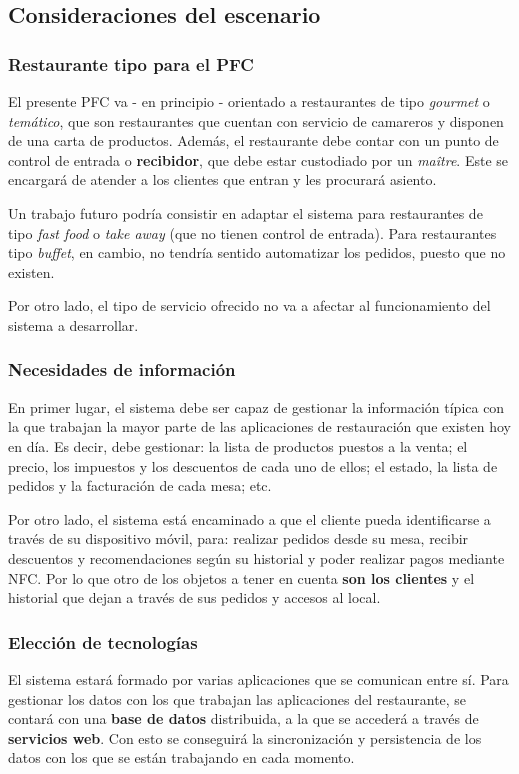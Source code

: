   \subsection{Consideraciones del escenario}
    \subsubsection{Restaurante tipo para el \acs{PFC}}
  El presente \acs{PFC} va - en principio - orientado a restaurantes de tipo
  \emph{gourmet} o \emph{temático}, que son restaurantes que cuentan con
  servicio de camareros y disponen de una carta de productos. Además, el
  restaurante debe contar con un punto de  control de entrada o
  \textbf{recibidor}, que debe estar custodiado por un \emph{maître}. Este se
  encargará de atender a los clientes que entran y les procurará asiento.

  Un trabajo futuro podría consistir en adaptar el sistema para restaurantes 
  de tipo \emph{fast food} o \emph{take away} (que no tienen control de 
  entrada). Para restaurantes tipo \emph{buffet}, en cambio, no tendría
  sentido automatizar los pedidos, puesto que no existen.

  Por otro lado, el tipo de servicio ofrecido no va a afectar al funcionamiento
  del sistema a desarrollar.

    \subsubsection{Necesidades de información}
  En primer lugar, el sistema debe ser capaz de gestionar la información
  típica con la que trabajan la mayor parte de las aplicaciones de
  restauración que existen hoy en día. Es decir, debe gestionar: la lista
  de productos puestos a la venta; el precio, los impuestos y los
  descuentos de cada uno de ellos; el estado, la lista de pedidos y la
  facturación de cada mesa; etc.

  Por otro lado, el sistema está encaminado a que el cliente pueda 
  identificarse a través de su dispositivo móvil, para: realizar
  pedidos desde su mesa, recibir descuentos y recomendaciones según su
  historial y poder realizar pagos mediante \acs{NFC}. Por lo que otro de los
  objetos a tener en cuenta \textbf{son los clientes} y el historial que dejan
  a través de sus pedidos y accesos al local.

    \subsubsection{Elección de tecnologías}
  El sistema estará formado por varias aplicaciones que se comunican entre sí.
  Para gestionar los datos con los que trabajan las aplicaciones del
  restaurante, se contará con una \textbf{base de datos} distribuida, a la que
  se accederá a través de \textbf{servicios web}. Con esto se conseguirá la
  sincronización y persistencia de los datos con los que se están trabajando
  en cada momento.

